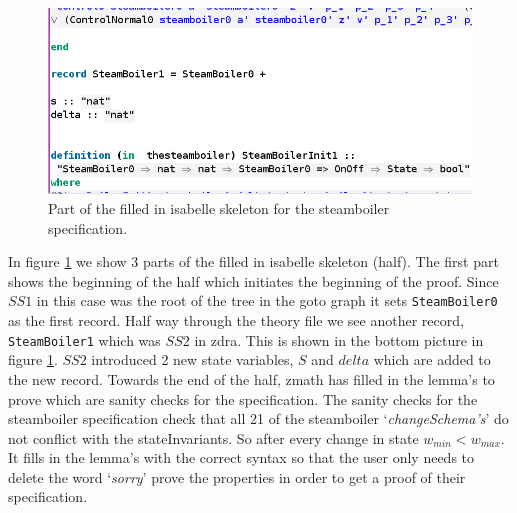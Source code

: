 \begin{figure}[H]
\begin{minipage}{0.53\textwidth}
\end{minipage}\hfill\hfill
\includegraphics[scale=0.4]{Figures/Evaluation/5imageb.png}
\caption{Part of the filled in isabelle skeleton for the steamboiler specification.\label{fig:filledinsteamskeleton}}
\end{figure}

In figure \ref{fig:filledinsteamskeleton} we show 3 parts of the filled in
isabelle skeleton (\gls{half}). The first part shows the beginning of the
\gls{half} which initiates the beginning of the proof. Since $SS1$ in this case
was the root of the tree in the goto graph it sets \verb|SteamBoiler0| as the
first record. Half way through the theory file we see another record,
\verb|SteamBoiler1| which was $SS2$ in \gls{zdra}. This is shown in the bottom
picture in figure \ref{fig:filledinsteamskeleton}. $SS2$ introduced 2 new state
variables, $S$ and $delta$ which are added to the new record. Towards the end of
the \gls{half}, \gls{zmath} has filled in the lemma's to prove which are sanity
checks for the specification.
The sanity checks for the steamboiler specification check that all 21 of the 
steamboiler `\textit{changeSchema's}' do not conflict with the stateInvariants.
So after every change in state $w_{min}<w_{max}$.
It fills in the lemma's with the correct syntax so
that the user only needs to delete the word `\emph{sorry}' prove the properties
in order to get a proof of their specification. 

